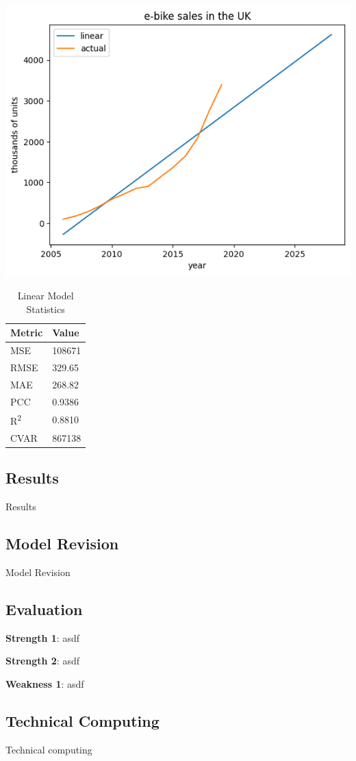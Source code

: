 \begin{table}[h]
    \begin{minipage}{0.7\linewidth}
        \centering
        \includegraphics[width=\textwidth]{linear}%
        \label{fig:ebike_lr}
    \end{minipage}%
    \begin{minipage}{0.3\linewidth}
        \centering
        \begin{tabular}{ll}
            \toprule
            Metric               & Value  \\
            \midrule
            MSE                  & 108671 \\
            RMSE                 & 329.65 \\
            MAE                  & 268.82 \\
            PCC                  & 0.9386 \\
            R\textsuperscript{2} & 0.8810 \\
            CVAR                 & 867138 \\
            \bottomrule
        \end{tabular}
        \vspace{8pt}
        \caption{Linear Model Statistics}
        \label{tab:ebike_lr_err}
    \end{minipage}
\end{table}


\subsection{Results}
Results

\subsection{Model Revision}
Model Revision

\subsection{Evaluation}

\noindent\textbf{Strength 1}: asdf

\noindent\textbf{Strength 2}: asdf

\noindent\textbf{Weakness 1}: asdf

\subsection{Technical Computing}
Technical computing
